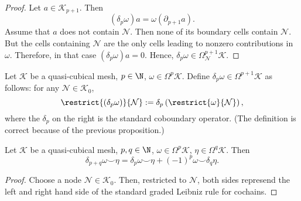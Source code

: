 \begin{proof}
  Let $a \in \mathcal{K}_{p + 1}$.
  Then
  \begin{equation}
    (\delta_p \omega) a = \omega(\partial_{p + 1} a).
  \end{equation}
  Assume that $a$ does not contain $\mathcal{N}$.
  Then none of its boundary cells contain $\mathcal{N}$.
  But the cells containing $\mathcal{N}$ are the only cells leading to nonzero
  contributions in $\omega$.
  Therefore, in that case $(\delta_p \omega) a = 0$.
  Hence,
  $\delta_p \omega \in \Omega^{p + 1}_\mathcal{N} \mathcal{K}$.
\end{proof}
\begin{definition}
  Let
    $\mathcal{K}$ be a quasi-cubical mesh,
    $p \in \N$,
    $\omega \in \Omega^p \mathcal{K}$.
  Define $\delta_p \omega \in \Omega^{p + 1} \mathcal{K}$ as follows:
  for any $\mathcal{N} \in \mathcal{K}_0$,
  \begin{equation}
    \restrict{(\delta_p \omega)}{\mathcal{N}}
    := \delta_p\left(\restrict{\omega}{\mathcal{N}}\right),
  \end{equation}
  where the $\delta_p$ on the right is the standard coboundary operator.
  (The definition is correct because of the previous proposition.)
\end{definition}
\begin{proposition}
  Let
    $\mathcal{K}$ be a quasi-cubical mesh,
    $p, q \in \N$,
    $\omega \in \Omega^p \mathcal{K}$,
    $\eta \in \Omega^q \mathcal{K}$.
  Then
  \begin{equation}
    \delta_{p + q} \omega \smile \eta
    = \delta_p \omega \smile \eta + (-1)^p \omega \smile \delta_q \eta.
  \end{equation}
\end{proposition}
\begin{proof}
  Choose a node $\mathcal{N} \in \mathcal{K}_0$.
  Then, restricted to $\mathcal{N}$, both sides represend the left and right
  hand side of the standard graded Leibniz rule for cochains.
\end{proof}
